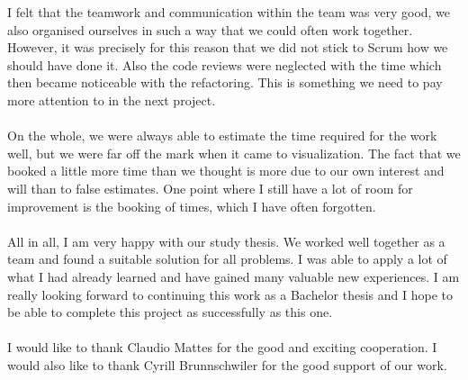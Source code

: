 I felt that the teamwork and communication within the team was very good, we also organised ourselves in such a way that we could often work together. However, it was precisely for this reason that we did not stick to Scrum how we should have done it. Also the code reviews were neglected with the time which then became noticeable with the refactoring. This is something we need to pay more attention to in the next project.
\\\\
On the whole, we were always able to estimate the time required for the work well, but we were far off the mark when it came to visualization. The fact that we booked a little more time than we thought is more due to our own interest and will than to false estimates. One point where I still have a lot of room for improvement is the booking of times, which I have often forgotten.
\\\\
All in all, I am very happy with our study thesis. We worked well together as a team and found a suitable solution for all problems. I was able to apply a lot of what I had already learned and have gained many valuable new experiences. I am really looking forward to continuing this work as a Bachelor thesis and I hope to be able to complete this project as successfully as this one.
\\\\
I would like to thank Claudio Mattes for the good and exciting cooperation. I would also like to thank Cyrill Brunnschwiler for the good support of our work.

